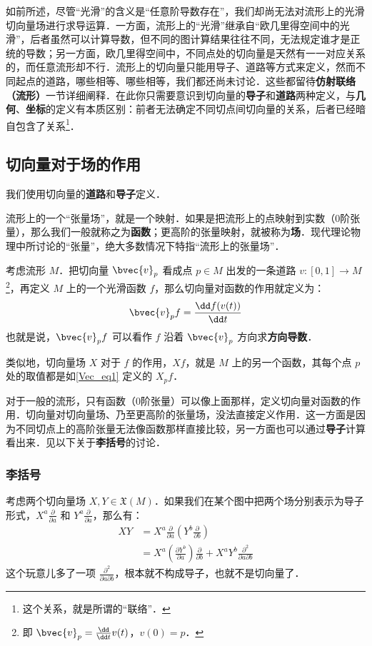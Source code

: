 如前所述，尽管“光滑”的含义是“任意阶导数存在”，我们却尚无法对流形上的光滑切向量场进行求导运算．一方面，流形上的“光滑”继承自“欧几里得空间中的光滑”，后者虽然可以计算导数，但不同的图计算结果往往不同，无法规定谁才是正统的导数；另一方面，欧几里得空间中，不同点处的切向量是天然有一一对应关系的，而任意流形却不行．流形上的切向量只能用导子、道路等方式来定义，然而不同起点的道路，哪些相等、哪些相等，我们都还尚未讨论．这些都留待\textbf{仿射联络（流形）}一节详细阐释．在此你只需要意识到切向量的\textbf{导子}和\textbf{道路}两种定义，与\textbf{几何}、\textbf{坐标}的定义有本质区别：前者无法确定不同切点间切向量的关系，后者已经暗自包含了关系\footnote{这个关系，就是所谓的“联络”．}．


\subsection{切向量对于场的作用}
我们使用切向量的\textbf{道路}和\textbf{导子}定义．

流形上的一个“张量场”，就是一个映射．如果是把流形上的点映射到实数（0阶张量），那么我们一般就称之为\textbf{函数}；更高阶的张量映射，就被称为\textbf{场}．现代理论物理中所讨论的“张量”，绝大多数情况下特指“流形上的张量场”．

考虑流形 $M$．把切向量 $\bvec{v}_p$ 看成点 $p\in M$ 出发的一条道路 $v:[0, 1]\to M$\footnote{即 $\bvec{v}_p=\frac{\dd}{\dd t}v(t)$，$v(0)=p$．}，再定义 $M$ 上的一个光滑函数 $f$，那么切向量对函数的作用就定义为：
\begin{equation}\label{Vec_eq1}
\bvec{v}_pf=\frac{\dd f(v(t))}{\dd t}
\end{equation}
也就是说，$\bvec{v}_pf$ 可以看作 $f$ 沿着 $\bvec{v}_p$ 方向求\textbf{方向导数}．

类似地，切向量场 $X$ 对于 $f$ 的作用，$Xf$，就是 $M$ 上的另一个函数，其每个点 $p$ 处的取值都是如\autoref{Vec_eq1} 定义的 $X_p f$．

对于一般的流形，只有函数（0阶张量）可以像上面那样，定义切向量对函数的作用．切向量对切向量场、乃至更高阶的张量场，没法直接定义作用．这一方面是因为不同切点上的高阶张量无法像函数那样直接比较，另一方面也可以通过\textbf{导子}计算看出来．见以下关于\textbf{李括号}的讨论．

\subsubsection{李括号}

考虑两个切向量场 $X, Y\in\mathfrak{X}(M)$．如果我们在某个图中把两个场分别表示为导子形式，$X^a\frac{\partial}{\partial a}$ 和 $Y^a\frac{\partial}{\partial a}$，那么有：
\begin{equation}
\begin{aligned}
XY&=X^a\frac{\partial}{\partial a}(Y^b\frac{\partial}{\partial b})\\
&=X^a(\frac{\partial Y^b}{\partial a})\frac{\partial}{\partial b}+X^aY^b\frac{\partial^2}{\partial a\partial b}
\end{aligned}
\end{equation}
这个玩意儿多了一项 $\frac{\partial^2}{\partial a\partial b}$，根本就不构成导子，也就不是切向量了．

